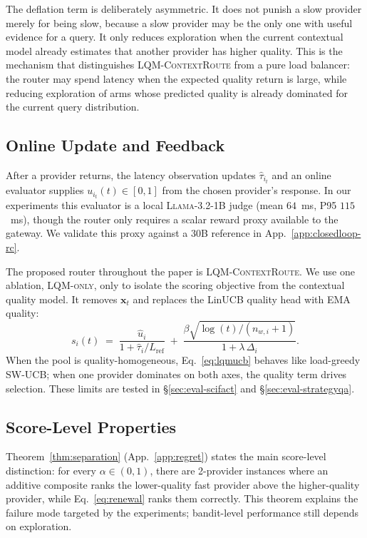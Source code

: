 \documentclass[11pt]{article}
\newcommand{\lqm}{\textsc{LQM-only}}
\newcommand{\lqmcr}{\textsc{LQM-ContextRoute}}
\begin{document}
The deflation term is deliberately asymmetric. It does not punish a slow provider merely for being slow, because a slow provider may be the only one with useful evidence for a query. It only reduces exploration when the current contextual model already estimates that another provider has higher quality. This is the mechanism that distinguishes \lqmcr{} from a pure load balancer: the router may spend latency when the expected quality return is large, while reducing exploration of arms whose predicted quality is already dominated for the current query distribution.

\subsection{Online Update and Feedback}
\label{sec:method-judge}

After a provider returns, the latency observation updates $\hat{\tau}_{i_t}$ and an online evaluator supplies $u_{i_t}(t)\in[0,1]$ from the chosen provider's response. In our experiments this evaluator is a local \textsc{Llama-3.2-1B} judge (mean $64$~ms, P95 $115$~ms), though the router only requires a scalar reward proxy available to the gateway. We validate this proxy against a 30B reference in App.~\ref{app:closedloop-rc}.

The proposed router throughout the paper is \lqmcr{}. We use one ablation, \lqm{}, only to isolate the scoring objective from the contextual quality model. It removes $\mathbf{x}_t$ and replaces the LinUCB quality head with EMA quality:
\begin{equation}
\label{eq:lqmucb}
  s_i(t) \;=\; \frac{\hat{u}_i}{1 + \hat{\tau}_i / L_{\text{ref}}}
    \;+\; \frac{\beta\sqrt{\log(t)/(n_{w,i}{+}1)}}{1 + \lambda\,\Delta_i}.
\end{equation}
When the pool is quality-homogeneous, Eq.~\ref{eq:lqmucb} behaves like load-greedy SW-UCB; when one provider dominates on both axes, the quality term drives selection. These limits are tested in \S\ref{sec:eval-scifact} and \S\ref{sec:eval-strategyqa}.

\subsection{Score-Level Properties}
\label{sec:method-regret}

Theorem~\ref{thm:separation} (App.~\ref{app:regret}) states the main score-level distinction: for every $\alpha\in(0,1)$, there are 2-provider instances where an additive composite ranks the lower-quality fast provider above the higher-quality provider, while Eq.~\ref{eq:renewal} ranks them correctly. This theorem explains the failure mode targeted by the experiments; bandit-level performance still depends on exploration.
\end{document}
